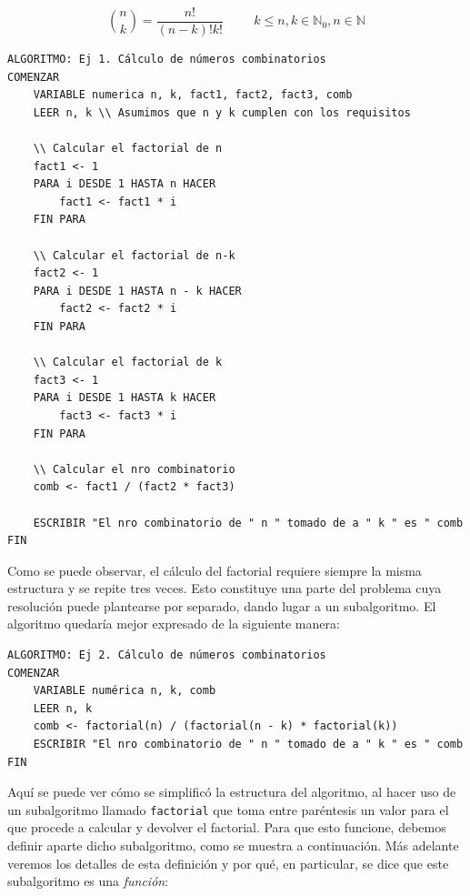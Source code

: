 \documentclass[]{book}
\begin{document}
\[ {n \choose k} = \frac{n!}{(n-k)!k!} \hspace{1cm} k \le n, k \in \mathbb{N}_0, n \in \mathbb{N}\]

\begin{verbatim}
ALGORITMO: Ej 1. Cálculo de números combinatorios
COMENZAR
    VARIABLE numerica n, k, fact1, fact2, fact3, comb
    LEER n, k \\ Asumimos que n y k cumplen con los requisitos

    \\ Calcular el factorial de n
    fact1 <- 1
    PARA i DESDE 1 HASTA n HACER
        fact1 <- fact1 * i
    FIN PARA

    \\ Calcular el factorial de n-k
    fact2 <- 1
    PARA i DESDE 1 HASTA n - k HACER
        fact2 <- fact2 * i
    FIN PARA

    \\ Calcular el factorial de k
    fact3 <- 1
    PARA i DESDE 1 HASTA k HACER
        fact3 <- fact3 * i
    FIN PARA

    \\ Calcular el nro combinatorio
    comb <- fact1 / (fact2 * fact3)

    ESCRIBIR "El nro combinatorio de " n " tomado de a " k " es " comb
FIN
\end{verbatim}

Como se puede observar, el cálculo del factorial requiere siempre la
misma estructura y se repite tres veces. Esto constituye una parte del
problema cuya resolución puede plantearse por separado, dando lugar a un
subalgoritmo. El algoritmo quedaría mejor expresado de la siguiente
manera:

\begin{verbatim}
ALGORITMO: Ej 2. Cálculo de números combinatorios
COMENZAR
    VARIABLE numérica n, k, comb
    LEER n, k 
    comb <- factorial(n) / (factorial(n - k) * factorial(k))
    ESCRIBIR "El nro combinatorio de " n " tomado de a " k " es " comb
FIN
\end{verbatim}

Aquí se puede ver cómo se simplificó la estructura del algoritmo, al
hacer uso de un subalgoritmo llamado \texttt{factorial} que toma entre
paréntesis un valor para el que procede a calcular y devolver el
factorial. Para que esto funcione, debemos definir aparte dicho
subalgoritmo, como se muestra a continuación. Más adelante veremos los
detalles de esta definición y por qué, en particular, se dice que este
subalgoritmo es una \emph{función}:
\end{document}
